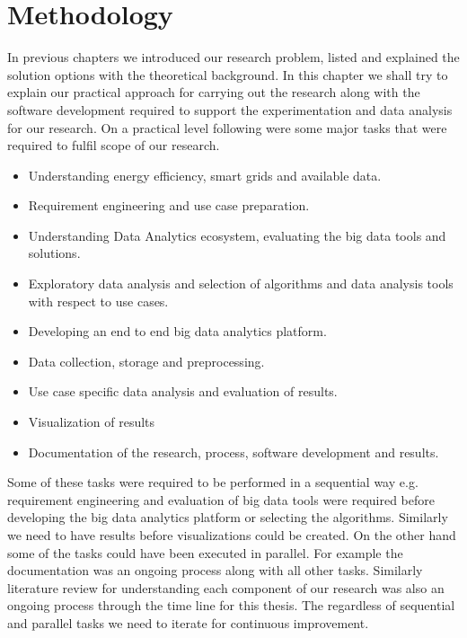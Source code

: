 \chapter{Methodology}
\label{Methodology}
In previous chapters we introduced our research problem, listed and explained the solution options with the theoretical background. In this chapter we shall try to explain our practical approach for carrying out the research along with the software development required to support the experimentation and data analysis for our research. On a practical level following were some major tasks that were required to fulfil scope of our research.
\begin{itemize}
\item Understanding energy efficiency, smart grids and available data.
\item Requirement engineering and use case preparation.
\item Understanding Data Analytics ecosystem, evaluating the big data tools and solutions.
\item Exploratory data analysis and selection of algorithms and data analysis tools with respect to use cases. 
\item Developing an end to end big data analytics platform.
\item Data collection, storage and preprocessing.
\item Use case specific data analysis and evaluation of results.
\item Visualization of results 
\item Documentation of the research, process, software development and results.
\end{itemize}
Some of these tasks were required to be performed in a sequential way e.g. requirement engineering and evaluation of big data tools were required before developing the big data analytics platform or selecting the algorithms. Similarly we need to have results before visualizations could be created. On the other hand some of the tasks could have been executed in parallel. For example the documentation was an ongoing process along with all other tasks. Similarly literature review for understanding each component of our research was also an ongoing process through the time line for this thesis. The regardless of sequential and parallel tasks we need to iterate for continuous improvement.

